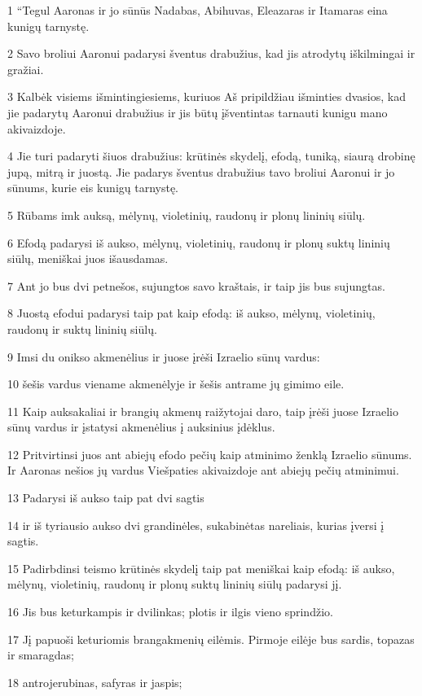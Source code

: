\par 1 “Tegul Aaronas ir jo sūnūs Nadabas, Abihuvas, Eleazaras ir Itamaras eina kunigų tarnystę. 
\par 2 Savo broliui Aaronui padarysi šventus drabužius, kad jis atrodytų iškilmingai ir gražiai. 
\par 3 Kalbėk visiems išmintingiesiems, kuriuos Aš pripildžiau išminties dvasios, kad jie padarytų Aaronui drabužius ir jis būtų įšventintas tarnauti kunigu mano akivaizdoje. 
\par 4 Jie turi padaryti šiuos drabužius: krūtinės skydelį, efodą, tuniką, siaurą drobinę jupą, mitrą ir juostą. Jie padarys šventus drabužius tavo broliui Aaronui ir jo sūnums, kurie eis kunigų tarnystę. 
\par 5 Rūbams imk auksą, mėlynų, violetinių, raudonų ir plonų lininių siūlų. 
\par 6 Efodą padarysi iš aukso, mėlynų, violetinių, raudonų ir plonų suktų lininių siūlų, meniškai juos išausdamas. 
\par 7 Ant jo bus dvi petnešos, sujungtos savo kraštais, ir taip jis bus sujungtas. 
\par 8 Juostą efodui padarysi taip pat kaip efodą: iš aukso, mėlynų, violetinių, raudonų ir suktų lininių siūlų. 
\par 9 Imsi du onikso akmenėlius ir juose įrėši Izraelio sūnų vardus: 
\par 10 šešis vardus viename akmenėlyje ir šešis antrame jų gimimo eile. 
\par 11 Kaip auksakaliai ir brangių akmenų raižytojai daro, taip įrėši juose Izraelio sūnų vardus ir įstatysi akmenėlius į auksinius įdėklus. 
\par 12 Pritvirtinsi juos ant abiejų efodo pečių kaip atminimo ženklą Izraelio sūnums. Ir Aaronas nešios jų vardus Viešpaties akivaizdoje ant abiejų pečių atminimui. 
\par 13 Padarysi iš aukso taip pat dvi sagtis 
\par 14 ir iš tyriausio aukso dvi grandinėles, sukabinėtas nareliais, kurias įversi į sagtis. 
\par 15 Padirbdinsi teismo krūtinės skydelį taip pat meniškai kaip efodą: iš aukso, mėlynų, violetinių, raudonų ir plonų suktų lininių siūlų padarysi jį. 
\par 16 Jis bus keturkampis ir dvilinkas; plotis ir ilgis vieno sprindžio. 
\par 17 Jį papuoši keturiomis brangakmenių eilėmis. Pirmoje eilėje bus sardis, topazas ir smaragdas; 
\par 18 antroje­rubinas, safyras ir jaspis; 
